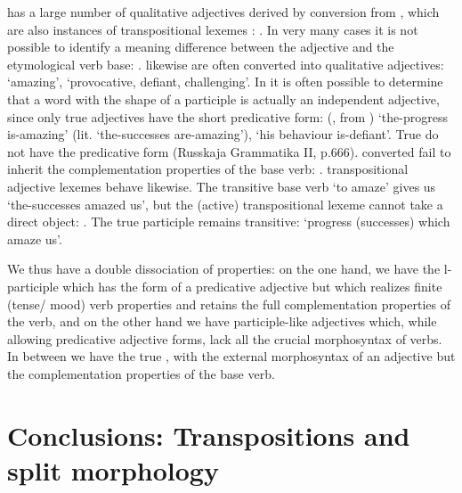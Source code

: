 \documentclass[output=paper,
modfonts
]{LSP/langsci}
\begin{document}
 has a large number of qualitative adjectives derived by conversion from , which are also instances of transpositional lexemes \parencite{Spencer16:MorphMetatheory}:  . In very many cases it is not possible to identify a meaning difference between the adjective and the etymological verb base: .   likewise are often converted into qualitative adjectives:  ‘amazing’,  ‘provocative, defiant, challenging’. In  it is often possible to determine that a word with the shape of a participle is actually an independent adjective, since only true adjectives have the short predicative form:  (, from ) ‘the-progress is-amazing’ (lit. ‘the-successes are-amazing’),  ‘his behaviour is-defiant’. True  do not have the predicative form (Russkaja Grammatika II, p.666).  converted  fail to inherit the complementation properties of the base verb: .  transpositional adjective lexemes behave likewise. The transitive base verb  ‘to amaze’ gives us  ‘the-successes amazed us’, but the (active) transpositional lexeme cannot take a direct object: . The true participle remains transitive:  ‘progress (successes) which amaze us’.

We thus have a double dissociation of properties: on the one hand, we have the l-participle which has the form of a predicative adjective but which realizes finite (tense/ mood) verb properties and retains the full complementation properties of the verb, and on the other hand we have participle-like adjectives which, while allowing predicative adjective forms, lack all the crucial morphosyntax of verbs. In between we have the true , with the external morphosyntax of an adjective but the complementation properties of the base verb. 

\section{Conclusions: Transpositions and split morphology}
\end{document}

